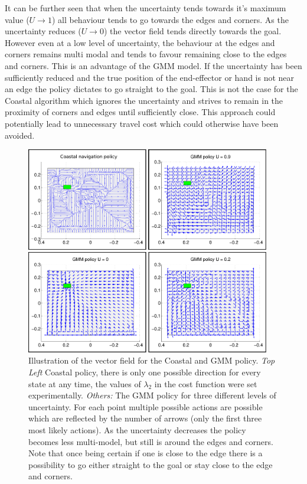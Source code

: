 It can be further seen that when the uncertainty tends towards it's maximum value ($U \rightarrow 1$) 
all behaviour tends to go towards the edges and corners. As the uncertainty reduces ($U \rightarrow 0$) the vector field 
tends directly towards the goal. However even at a low level of uncertainty, the behaviour at the edges and corners remains 
multi modal and tends to favour remaining close to the edges and corners. 
This is an advantage of the GMM model. If the uncertainty has been sufficiently reduced and 
the true position of the end-effector or hand is not near an 
edge the policy dictates to go straight to the goal. This is not the case for the Coastal algorithm which ignores the 
uncertainty and strives to remain in the proximity of corners and edges until sufficiently close. 
This approach could potentially lead to unnecessary travel cost which could otherwise have been avoided.

\begin{figure}[h!]
  \centering
  \includegraphics[width=0.95\textwidth]{./ch3-Search/Figures/Figure10}
  \caption{Illustration of the vector field for the Coastal and GMM policy. \textit{Top Left} Coastal policy, there is only one possible direction for every 
  state at any time, the values of $\lambda_2$ in the cost function were set experimentally. \textit{Others:} The GMM policy for three different levels of
  uncertainty. For each point multiple possible actions are possible which are reflected by the number of arrows (only the first three most likely actions). As 
  the uncertainty decreases the policy becomes less multi-model, but still is around the edges and corners. Note that once being certain if one is close to the edge there
  is a possibility to go either straight to the goal or stay close to the edge and corners.}
  \label{fig:vectorfield}
\end{figure}

